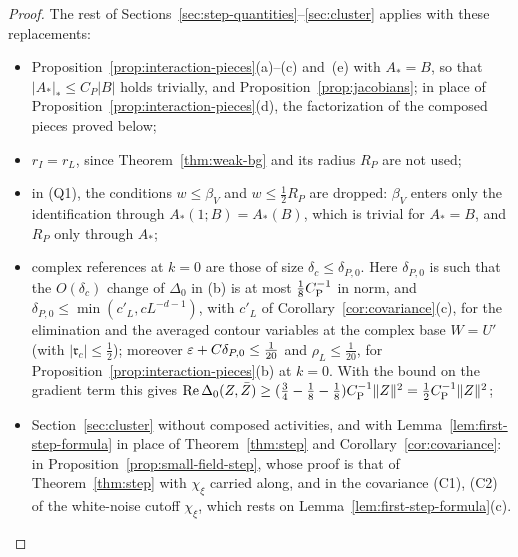 \begin{proof}
The rest of Sections~\ref{sec:step-quantities}--\ref{sec:cluster} applies with these replacements:
\begin{itemize}
\item Proposition~\ref{prop:interaction-pieces}(a)--(c) and~(e) with $A_*=B$, so that $|A_*|_*\le C_P|B|$ holds trivially, and Proposition~\ref{prop:jacobians}; in place of Proposition~\ref{prop:interaction-pieces}(d), the factorization of the composed pieces proved below;
\item $r_I=r_L$, since Theorem~\ref{thm:weak-bg} and its radius $R_P$ are not used;
\item in (Q1), the conditions $w\le\beta_V$ and $w\le\frac12R_P$ are dropped: $\beta_V$ enters only the identification through $A_*(1;B)=A_*(B)$, which is trivial for $A_*=B$, and $R_P$ only through $A_*$;
\item complex references at $k=0$ are those of size $\delta_c\le\delta_{P,0}$. Here $\delta_{P,0}$ is such that the $O(\delta_c)$ change of $\Delta_0$ in (b) is at most $\frac18C_{\rm P}^{-1}$ in norm, and $\delta_{P,0}\le\min(c'_L,cL^{-d-1})$, with $c'_L$ of Corollary~\ref{cor:covariance}(c), for the elimination and the averaged contour variables at the complex base $W=U'$ (with $|\mathfrak r_c|\le\frac12$); moreover $\varepsilon+C\delta_{P,0}\le\frac1{20}$ and $\rho_L\le\frac1{20}$, for Proposition~\ref{prop:interaction-pieces}(b) at $k=0$. With the bound on the gradient term this gives $\operatorname{Re}\Delta_0(Z,\bar Z)\ge(\frac34-\frac18-\frac18)C_{\rm P}^{-1}\|Z\|^2=\frac12C_{\rm P}^{-1}\|Z\|^2$;
\item Section~\ref{sec:cluster} without composed activities, and with Lemma~\ref{lem:first-step-formula} in place of Theorem~\ref{thm:step} and Corollary~\ref{cor:covariance}: in Proposition~\ref{prop:small-field-step}, whose proof is that of Theorem~\ref{thm:step} with $\chi_\xi$ carried along, and in the covariance (C1), (C2) of the white-noise cutoff $\chi_\xi$, which rests on Lemma~\ref{lem:first-step-formula}(c).
\end{itemize}

\end{proof}
